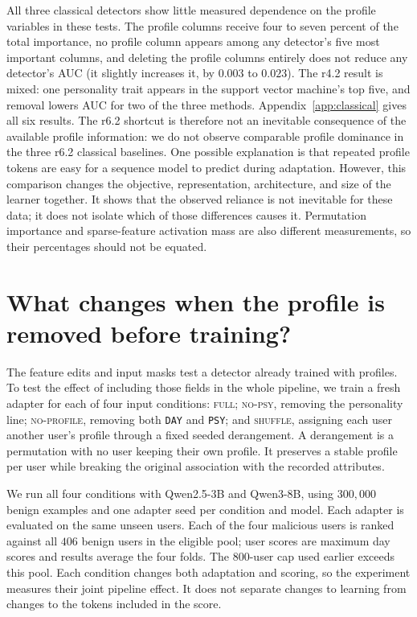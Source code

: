 \documentclass[10pt]{article} %
\begin{document}
All three classical detectors show little measured dependence on
the profile variables in these tests.
The profile columns receive four to seven percent of the total
importance, no profile column appears among any detector's five most
important columns, and deleting the profile columns entirely does not
reduce any detector's AUC (it slightly increases it, by $0.003$ to
$0.023$). The r4.2 result is mixed: one personality trait appears in
the support vector machine's top five, and removal lowers AUC for two
of the three methods. Appendix~\ref{app:classical} gives all six results.
The r6.2 shortcut is therefore not an
inevitable consequence of the available profile information: we do not
observe comparable profile dominance in the three r6.2 classical baselines.
One possible explanation is that repeated profile tokens are easy for
a sequence model to predict during adaptation. However, this comparison
changes the objective, representation, architecture, and size of the
learner together. It shows that the observed reliance is not inevitable
for these data; it does not isolate which of those differences causes it.
Permutation importance and sparse-feature activation mass are also
different measurements, so their percentages should not be equated.

\section{What changes when the profile is removed before training?}
\label{sec:factorial}

The feature edits and input masks test a detector already trained with
profiles. To test the effect of including those fields in the whole
pipeline, we train a fresh adapter for each of four input conditions:
\textsc{full}; \textsc{no-psy}, removing the personality line;
\textsc{no-profile}, removing both \texttt{DAY} and \texttt{PSY}; and
\textsc{shuffle}, assigning each user another user's profile through a
fixed seeded derangement. A derangement is a permutation with no user
keeping their own profile. It preserves a stable profile per user while
breaking the original association with the recorded attributes.

We run all four conditions with Qwen2.5-3B and Qwen3-8B, using
$300{,}000$ benign examples and one adapter seed per condition and model.
Each adapter is evaluated on the same unseen users. Each of the four
malicious users is ranked against all $406$ benign users in the eligible
pool; user scores are maximum day scores and results average the four
folds. The $800$-user cap used earlier exceeds this pool. Each condition
changes both adaptation and scoring, so the experiment measures their
joint pipeline effect. It does not separate changes to learning from
changes to the tokens included in the score.
\end{document}
